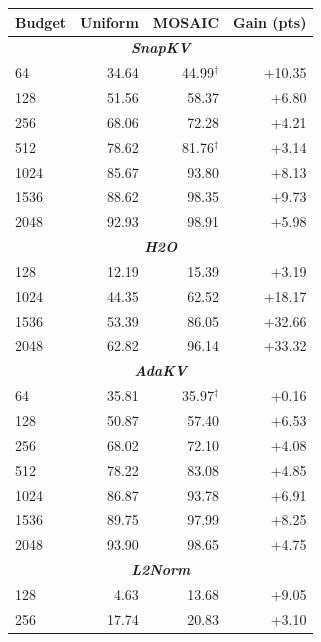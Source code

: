 \begin{table}[t]
  \centering
  \footnotesize
  \setlength{\tabcolsep}{7pt}
  \begin{tabular}{@{} l r r r @{}}
    \toprule
    \textbf{Budget} & \textbf{Uniform} & \textbf{MOSAIC} & \textbf{Gain (pts)} \\
    \midrule
    \multicolumn{4}{c}{\textbf{\textit{SnapKV}}} \\
    \midrule
    \rowcolor{gray!10}
    64 & 34.64 & 44.99$^\dagger$ & +10.35 \\
    128 & 51.56 & 58.37 & +6.80 \\
    \rowcolor{gray!10}
    256 & 68.06 & 72.28 & +4.21 \\
    512 & 78.62 & 81.76$^\dagger$ & +3.14 \\
    \rowcolor{gray!10}
    1024 & 85.67 & 93.80 & +8.13 \\
    1536 & 88.62 & 98.35 & +9.73 \\
    \rowcolor{gray!10}
    2048 & 92.93 & 98.91 & +5.98 \\
    \midrule
    \multicolumn{4}{c}{\textbf{\textit{H2O}}} \\
    \midrule
    \rowcolor{gray!10}
    128 & 12.19 & 15.39 & +3.19 \\
    1024 & 44.35 & 62.52 & +18.17 \\
    \rowcolor{gray!10}
    1536 & 53.39 & 86.05 & +32.66 \\
    2048 & 62.82 & 96.14 & +33.32 \\
    \midrule
    \multicolumn{4}{c}{\textbf{\textit{AdaKV}}} \\
    \midrule
    \rowcolor{gray!10}
    64 & 35.81 & 35.97$^\dagger$ & +0.16 \\
    128 & 50.87 & 57.40 & +6.53 \\
    \rowcolor{gray!10}
    256 & 68.02 & 72.10 & +4.08 \\
    512 & 78.22 & 83.08 & +4.85 \\
    \rowcolor{gray!10}
    1024 & 86.87 & 93.78 & +6.91 \\
    1536 & 89.75 & 97.99 & +8.25 \\
    \rowcolor{gray!10}
    2048 & 93.90 & 98.65 & +4.75 \\
    \midrule
    \multicolumn{4}{c}{\textbf{\textit{L2Norm}}} \\
    \midrule
    \rowcolor{gray!10}
    128 & 4.63 & 13.68 & +9.05 \\
    256 & 17.74 & 20.83 & +3.10 \\

\end{tabular}
\end{table}
